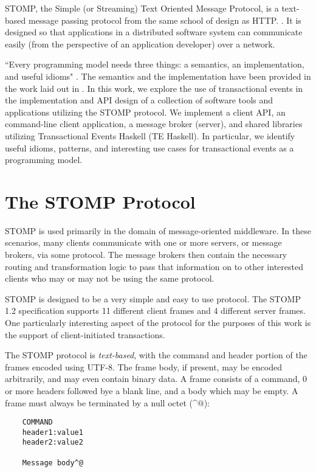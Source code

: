 \documentclass[conference, letterpaper]{IEEEtran}
\begin{document}
STOMP, the Simple (or Streaming) Text Oriented Message Protocol, is a text-based message passing protocol from the same school of design as HTTP.
\cite{stomp:spec}. It is designed so that applications in a distributed software system can communicate easily (from the 
perspective of an application developer) over a network.

``Every programming model needs three things: a semantics, an implementation, and useful idioms" 
\cite{te:idioms}. The semantics and the implementation have been provided in the work laid out in \cite{te:original}.
In this work, we explore the use of transactional events in the implementation and API design of a
collection of software tools and applications utilizing the STOMP protocol. We implement a client 
API, an command-line client application, a message broker (server), and shared libraries utilizing 
Transactional Events Haskell (TE Haskell). In particular, we identify useful idioms, patterns,
and interesting use cases for transactional events as a programming model.

\section{The STOMP Protocol}

STOMP is used primarily in the domain of message-oriented middleware. In these scenarios, many clients
communicate with one or more servers, or message brokers, via some protocol. The message brokers then contain the necessary routing and transformation logic to pass that information on to other interested clients who may or may not be using the same protocol.

STOMP is designed to be a very simple and easy to use protocol. The STOMP 1.2 specification supports 11 different client frames and 4 different server frames. One particularly interesting aspect of the protocol for the purposes of this work is the support of client-initiated transactions.

The STOMP protocol is \textit{text-based}, with the command and header portion of the frames encoded using UTF-8. The frame body, if present, may be encoded arbitrarily, and may even contain binary data. A frame consists of a command, 0 or more headers followed bye a blank line, and a body which may be empty. A frame must always be terminated by a null octet (\^{}@):

\begin{verbatim}
    COMMAND
    header1:value1
    header2:value2

    Message body^@
\end{verbatim}
\end{document}

